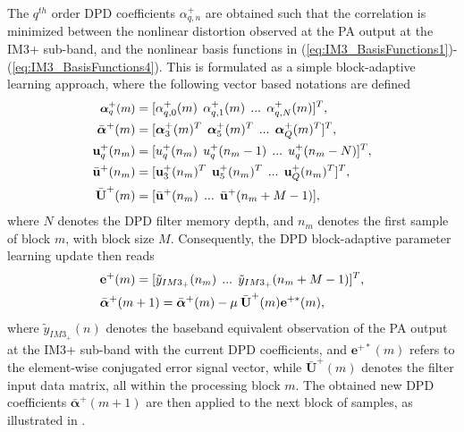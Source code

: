 The $q^{th}$ order DPD coefficients $\alpha^+_{q,n}$ are obtained such that the correlation is minimized between the nonlinear distortion observed at the PA output at the IM3+ sub-band, and the nonlinear basis functions in (\ref{eq:IM3_BasisFunctions1})-(\ref{eq:IM3_BasisFunctions4}). 
This is formulated as a simple block-adaptive learning approach, where the following vector based notations are defined
\begin{align}
\small
\boldsymbol{\alpha}^+_q(m) &= [\alpha^+_{q,0}(m)\:\:\alpha^+_{q,1}(m)\:\: ... \:\: \alpha^+_{q,N}(m)]^T, \\
\bar{\boldsymbol{\alpha}}^+(m) &= [\boldsymbol{\alpha}^+_3(m)^T \:\: \boldsymbol{\alpha}^+_5(m)^T \:\: ... \:\: \boldsymbol{\alpha}^+_Q(m)^T]^T, \\
\textbf{u}^+_q(n_m) &= [u^+_q(n_m)\:\:u^+_q(n_m-1) \:\: ... \:\: u^+_q(n_m-N)]^T, \\
\bar{\textbf{u}}^+(n_m) &= [\textbf{u}^+_3(n_m)^T \:\: \textbf{u}^+_5(n_m)^T  \:\: ... \:\: \textbf{u}^+_Q(n_m)^T ]^T, \\
\bar{\textbf{U}}^+(m) &= [\bar{\textbf{u}}^+(n_m) \:\: ... \:\: \bar{\textbf{u}}^+(n_m+M-1)],
\end{align}
\normalsize
where $N$ denotes the DPD filter memory depth, and $n_m$ denotes the first sample of block $m$, with block size $M$.
Consequently, the DPD block-adaptive parameter learning update then reads
\begin{align}
\small
&\textbf{e}^+(m) = [\tilde{y}_{IM3_+}(n_m) \:\: ... \:\: \tilde{y}_{IM3_+}(n_m+M-1)]^T, \\
&\bar{\boldsymbol{\alpha}}^+(m+1) = \bar{\boldsymbol{\alpha}}^+(m) - \mu \: \bar{\textbf{U}}^+(m)\textbf{e}^{+*}(m), 
\label{eq:BlockAdaptive}
\end{align}
\normalsize
where $\tilde{y}_{IM3_+}(n)$ denotes the baseband equivalent observation of the PA output at the IM3+ sub-band with the current DPD coefficients, and $\textbf{e}^{+*}(m)$ refers to the element-wise conjugated error signal vector, while $\bar{\textbf{U}}^+(m)$ denotes the filter input data matrix, all within the processing block $m$. 
The obtained new DPD coefficients $\bar{\boldsymbol{\alpha}}^+(m+1)$ are then applied to the next block of samples, as illustrated in \cite{Asilomar2015}.

